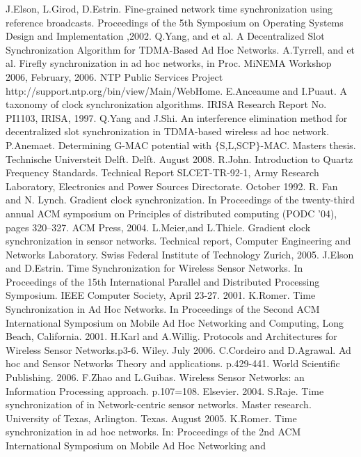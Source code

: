 \documentclass[a4paper,10pt]{report}
\begin{document}
\begin{thebibliography}{\textbf{References}}
J.Elson, L.Girod, D.Estrin. Fine-grained network time synchronization using reference broadcasts. Proceedings of the 5th Symposium on Operating Systems Design and Implementation ,2002.
Q.Yang, and et al. A Decentralized Slot Synchronization Algorithm for TDMA-Based Ad Hoc Networks.
A.Tyrrell, and et al. Firefly synchronization in ad hoc networks, in Proc. MiNEMA Workshop 2006, February, 2006.
NTP Public Services Project http://support.ntp.org/bin/view/Main/WebHome.
E.Anceaume and I.Puaut. A taxonomy of clock synchronization algorithms. IRISA Research Report No. PI1103, IRISA, 1997.
Q.Yang and J.Shi. An interference elimination method for decentralized slot synchronization in TDMA-based wireless ad hoc network.
 P.Anemaet. Determining G-MAC potential with $\{$S,L,SCP$\}$-MAC. Masters thesis. Technische Universteit Delft. Delft. August 2008.
R.John. Introduction to Quartz Frequency Standards. Technical Report SLCET-TR-92-1, Army Research Laboratory,
Electronics and Power Sources Directorate. October 1992.
R. Fan and N. Lynch. Gradient clock synchronization. In Proceedings of the twenty-third annual ACM symposium on Principles of distributed computing (PODC ’04), pages 320–327. ACM Press, 2004.
L.Meier,and L.Thiele. Gradient clock synchronization in sensor networks. Technical report, Computer Engineering and Networks
Laboratory. Swiss Federal Institute of Technology Zurich, 2005.
J.Elson and D.Estrin. Time Synchronization for Wireless Sensor Networks. In Proceedings of the 15th International Parallel and Distributed Processing Symposium. IEEE Computer Society, April 23-27. 2001.
K.Romer. Time Synchronization in Ad Hoc Networks. In Proceedings of the Second ACM International Symposium on Mobile Ad Hoc Networking and Computing, Long Beach, California. 2001.
H.Karl and A.Willig. Protocols and Architectures for Wireless Sensor Networks.p3-6. Wiley. July 2006.
C.Cordeiro and D.Agrawal. Ad hoc and Sensor Networks Theory and applications. p.429-441. World Scientific Publishing. 2006.
F.Zhao and  L.Guibas. Wireless Sensor Networks: an Information Processing approach. p.107=108. Elsevier. 2004.
 S.Raje. Time synchronization of in Network-centric sensor networks. Master research. University of Texas, Arlington. Texas. August 2005.
K.Romer. Time synchronization in ad hoc networks. In: Proceedings of the 2nd ACM International Symposium on Mobile Ad Hoc Networking and

\end{thebibliography}
\end{document}
